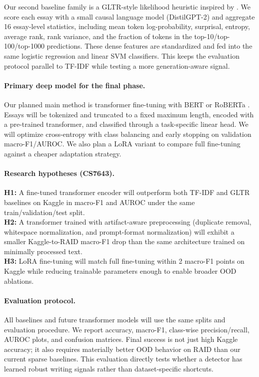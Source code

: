 \documentclass{article}
\begin{document}
Our second baseline family is a GLTR-style likelihood heuristic inspired by \citet{gehrmann2019gltr}. We score each essay with a small causal language model (DistilGPT-2) and aggregate 16 essay-level statistics, including mean token log-probability, surprisal, entropy, average rank, rank variance, and the fraction of tokens in the top-10/top-100/top-1000 predictions. These dense features are standardized and fed into the same logistic regression and linear SVM classifiers. This keeps the evaluation protocol parallel to TF-IDF while testing a more generation-aware signal.

\paragraph{Primary deep model for the final phase.}
Our planned main method is transformer fine-tuning with BERT or RoBERTa \citep{devlin2019bert,liu2019roberta}. Essays will be tokenized and truncated to a fixed maximum length, encoded with a pre-trained transformer, and classified through a task-specific linear head. We will optimize cross-entropy with class balancing and early stopping on validation macro-F1/AUROC. We also plan a LoRA variant \citep{hu2022lora} to compare full fine-tuning against a cheaper adaptation strategy.

\paragraph{Research hypotheses (CS7643).}
\textbf{H1:} A fine-tuned transformer encoder will outperform both TF-IDF and GLTR baselines on Kaggle in macro-F1 and AUROC under the same train/validation/test split.\\
\textbf{H2:} A transformer trained with artifact-aware preprocessing (duplicate removal, whitespace normalization, and prompt-format normalization) will exhibit a smaller Kaggle-to-RAID macro-F1 drop than the same architecture trained on minimally processed text.\\
\textbf{H3:} LoRA fine-tuning will match full fine-tuning within 2 macro-F1 points on Kaggle while reducing trainable parameters enough to enable broader OOD ablations.

\paragraph{Evaluation protocol.}
All baselines and future transformer models will use the same splits and evaluation procedure. We report accuracy, macro-F1, class-wise precision/recall, AUROC plots, and confusion matrices. Final success is not just high Kaggle accuracy; it also requires materially better OOD behavior on RAID than our current sparse baselines. This evaluation directly tests whether a detector has learned robust writing signals rather than dataset-specific shortcuts.
\end{document}
